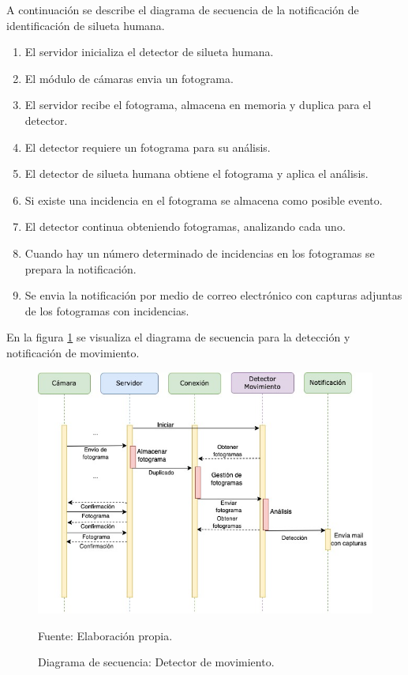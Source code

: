 A continuación se describe el diagrama de secuencia de la notificación de identificación de silueta humana.\\
\begin{enumerate}
    \item El servidor inicializa el detector de silueta humana.
    \item El módulo de cámaras envia un fotograma.    
    \item El servidor recibe el fotograma, almacena en memoria y duplica para el detector.
    \item El detector requiere un fotograma para su análisis.
    \item El detector de silueta humana obtiene el fotograma y aplica el análisis.
    \item Si existe una incidencia en el fotograma se almacena como posible evento. 
    \item El detector continua obteniendo fotogramas, analizando cada uno.
    \item Cuando hay un número determinado de incidencias en los fotogramas se prepara la notificación.
    \item Se envia la notificación por medio de correo electrónico con capturas adjuntas de los fotogramas con incidencias.
\end{enumerate}

En la figura \ref{fig:diag_sec_dec_movimiento} se visualiza el diagrama de secuencia para la detección y notificación de movimiento.

\begin{figure}[H]
    \begin{center}
        \includegraphics[width=13cm]{img/capitulo_4/movement_detection.jpg}
    \end{center}
    \begin{center}
        \caption{Diagrama de secuencia: Detector de movimiento.}
        Fuente: Elaboración propia.
        \label{fig:diag_sec_dec_movimiento}
    \end{center}
\end{figure}

